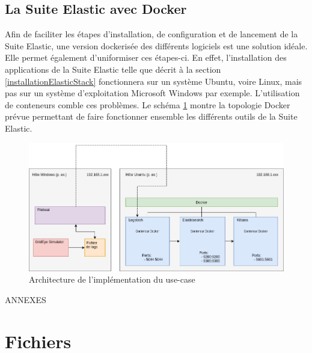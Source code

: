 \documentclass[paper=a4, fontsize=11pt]{scrartcl}
\begin{document}
\subsection{La Suite Elastic avec Docker}
Afin de faciliter les étapes d'installation, de configuration et de lancement de la Suite Elastic, une version \og dockerisée \fg des différents logiciels est une solution idéale. Elle permet également d'uniformiser ces étapes-ci. En effet, l'installation des applications de la Suite Elastic telle que décrit à la section \ref{installationElasticStack} fonctionnera sur un système Ubuntu, voire Linux, mais pas sur un système d'exploitation Microsoft Windows par exemple. L'utilisation de conteneurs comble ces problèmes.
Le schéma \ref{f-dockerTopology} montre la topologie Docker prévue permettant de faire fonctionner ensemble les différents outils de la Suite Elastic.
\begin{figure}[H]
    \centering
    \includegraphics[width=15cm]{img/docker_topology.png}
    \caption{Architecture de l'implémentation du use-case}
    \label{f-dockerTopology}
\end{figure}



\newpage

\thispagestyle{empty}
\centering
\vspace{10cm}
{\huge ANNEXES}

\newpage

\appendix
\justify

\listoftables
\newpage

\listoffigures
\newpage

\printbibliography

\newpage

\section{Fichiers}
\end{document}
